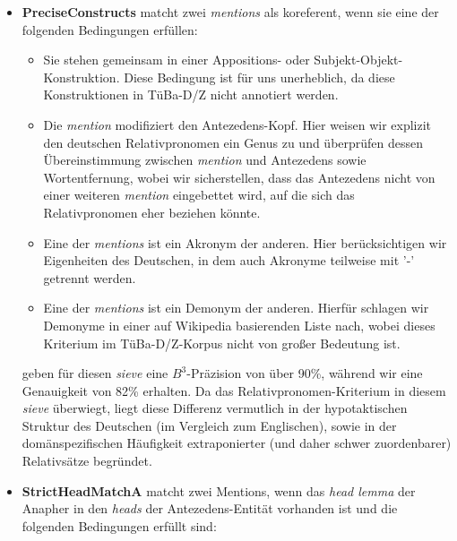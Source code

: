 \documentclass{scrartcl}
\begin{document}
\begin{itemize}
\item \textbf{PreciseConstructs} matcht zwei \textit{mentions} als koreferent, wenn sie eine der folgenden Bedingungen erfüllen: 
\begin{itemize}
	\item Sie stehen gemeinsam in einer Appositions- oder Subjekt-Objekt-Konstruktion. Diese Bedingung ist für uns unerheblich, da diese Konstruktionen in TüBa-D/Z nicht annotiert werden.
	\item Die \textit{mention} modifiziert den Antezedens-Kopf. Hier weisen wir explizit den deutschen Relativpronomen ein Genus zu und überprüfen dessen Übereinstimmung zwischen \textit{mention} und Antezedens sowie Wortentfernung, wobei wir sicherstellen, dass das Antezedens nicht von einer weiteren \textit{mention} eingebettet wird, auf die sich das Relativpronomen eher beziehen könnte.
	\item Eine der \textit{mentions} ist ein Akronym der anderen. Hier berücksichtigen wir Eigenheiten des Deutschen, in dem auch Akronyme teilweise mit '-' getrennt werden.
	\item Eine der \textit{mentions} ist ein Demonym der anderen. Hierfür schlagen wir Demonyme in einer auf Wikipedia basierenden Liste nach, wobei dieses Kriterium im TüBa-D/Z-Korpus nicht von großer Bedeutung ist.
\end{itemize}
 geben für diesen \textit{sieve} eine $B^3$-Präzision von über 90\%, während wir eine Genauigkeit von 82\% erhalten. Da das Relativpronomen-Kriterium in diesem \textit{sieve} überwiegt, liegt diese Differenz vermutlich in der hypotaktischen Struktur des Deutschen (im Vergleich zum Englischen), sowie in der domänspezifischen Häufigkeit extraponierter (und daher schwer zuordenbarer) Relativsätze begründet.

\item \textbf{StrictHeadMatchA} matcht zwei Mentions, wenn das \textit{head lemma} der Anapher in den \textit{heads} der Antezedens-Entität vorhanden ist und die folgenden Bedingungen erfüllt sind:



\end{itemize}
\end{document}
